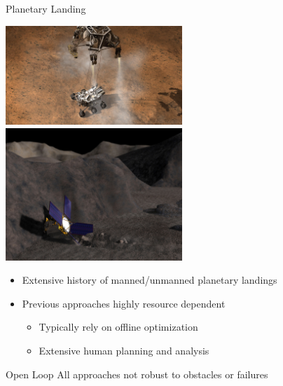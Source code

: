 \begin{frame}[t]{Planetary Landing} %
\begin{center}
    \includegraphics[width=0.5\textwidth,height=0.3\textheight,keepaspectratio]{figures/curiosity.jpg} ~
    \includegraphics[width=0.5\textwidth,height=0.3\textheight,keepaspectratio]{figures/430_new_landingnearstill.jpg}
\end{center}

\begin{itemize}
    \item Extensive history of manned/unmanned planetary landings
    \pause
    \item Previous approaches highly resource dependent
    \begin{itemize}
        \item Typically rely on offline optimization
        \item Extensive human planning and analysis
    \end{itemize}
\end{itemize}
\pause
\begin{block}{Open Loop}
    All approaches not robust to obstacles or failures
\end{block}
\end{frame} %
